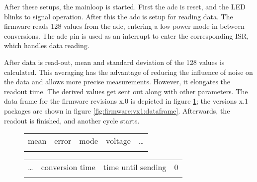 After these setups, the mainloop is started. First the \ac{adc} is reset, and the LED blinks to signal operation. After this the \ac{adc} is setup for reading data. The firmware reads 128 values from the \ac{adc}, entering a low power mode in between conversions. The \ac{adc}  pin is used as an interrupt to enter the corresponding \ac{ISR}, which handles data reading.

After data is read-out, mean and standard deviation of the 128 values is calculated. This averaging has the advantage of reducing the influence of noise on the data and allows more precise measurements. However, it elongates the readout time. The derived values get sent out along with other parameters. The data frame for the firmware revisions x.0 is depicted in figure \ref{fig:firmware:vx0:dataframe}; the versions x.1 packages are shown in figure \ref{fig:firmware:vx1:dataframe}. Afterwards, the readout is finished, and another cycle starts.
\begin{figure}
	\centering
	\begin{tabular}{|C{4cm}|C{4cm}|C{1cm}|C{1cm}|C{1cm}}
		mean & error & mode & voltage & \dots \\
	\end{tabular}
	\begin{tabular}{C{1cm}|C{4cm}|C{4cm}|C{1cm}|}
		\dots & conversion time & time until sending & 0\\
	\end{tabular}
	\label{fig:firmware:vx0:dataframe}
\end{figure} 
